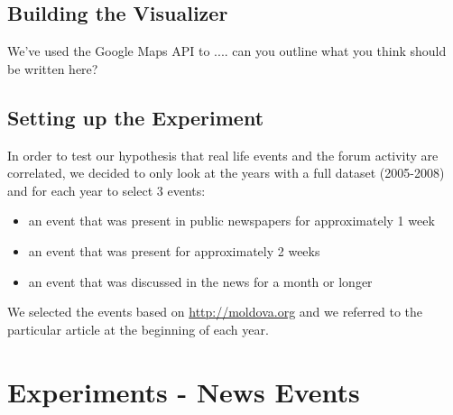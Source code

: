 \documentclass[11pt,a4paper,english]{article}
\begin{document}
		\subsection{Building the Visualizer}
		We've used the Google Maps API to .... can you outline what you think should be written here?	
		
		\subsection{Setting up the Experiment}
		In order to test our hypothesis that real life events and the forum activity are correlated, we decided to only look at the years with a full dataset (2005-2008) and for each year to select 3 events:
		\begin{itemize}
			\item an event that was present in public newspapers for approximately 1 week
			\item an event that was present for approximately 2 weeks
			\item an event that was discussed in the news for a month or longer
		\end{itemize}
		We selected the events based on \url{http://moldova.org} and we referred to the particular article at the beginning of each year.

 \newpage

	
	\section{Experiments - News Events}
\end{document}
